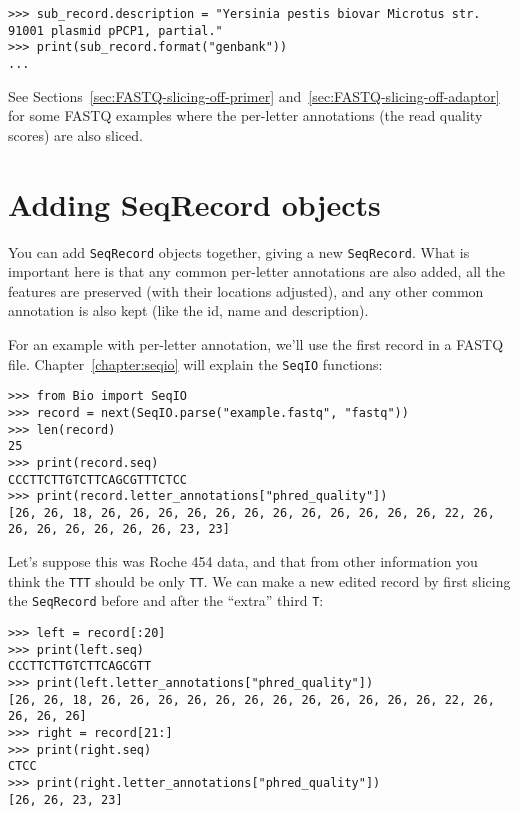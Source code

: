 \begin{verbatim}
>>> sub_record.description = "Yersinia pestis biovar Microtus str. 91001 plasmid pPCP1, partial."
>>> print(sub_record.format("genbank"))
...
\end{verbatim}

See Sections~\ref{sec:FASTQ-slicing-off-primer}
and~\ref{sec:FASTQ-slicing-off-adaptor} for some FASTQ examples where the
per-letter annotations (the read quality scores) are also sliced.

\section{Adding SeqRecord objects}
\label{sec:SeqRecord-addition}

You can add \verb|SeqRecord| objects together, giving a new \verb|SeqRecord|.
What is important here is that any common
per-letter annotations are also added, all the features are preserved (with their
locations adjusted), and any other common annotation is also kept (like the id, name
and description).

For an example with per-letter annotation, we'll use the first record in a
FASTQ file. Chapter~\ref{chapter:seqio} will explain the \verb|SeqIO| functions:

\begin{verbatim}
>>> from Bio import SeqIO
>>> record = next(SeqIO.parse("example.fastq", "fastq"))
>>> len(record)
25
>>> print(record.seq)
CCCTTCTTGTCTTCAGCGTTTCTCC
>>> print(record.letter_annotations["phred_quality"])
[26, 26, 18, 26, 26, 26, 26, 26, 26, 26, 26, 26, 26, 26, 26, 22, 26, 26, 26, 26, 26, 26, 26, 23, 23]
\end{verbatim}

\noindent Let's suppose this was Roche 454 data, and that from other information
you think the \texttt{TTT} should be only \texttt{TT}. We can make a new edited
record by first slicing the \verb|SeqRecord| before and after the ``extra''
third \texttt{T}:

\begin{verbatim}
>>> left = record[:20]
>>> print(left.seq)
CCCTTCTTGTCTTCAGCGTT
>>> print(left.letter_annotations["phred_quality"])
[26, 26, 18, 26, 26, 26, 26, 26, 26, 26, 26, 26, 26, 26, 26, 22, 26, 26, 26, 26]
>>> right = record[21:]
>>> print(right.seq)
CTCC
>>> print(right.letter_annotations["phred_quality"])
[26, 26, 23, 23]
\end{verbatim}

